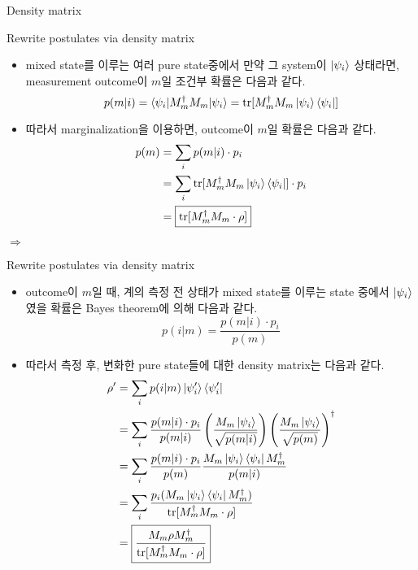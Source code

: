 \documentclass[9pt]{beamer}
\begin{document}
\begin{section}{Density matrix}
        \begin{frame}{Rewrite postulates via density matrix}
            \begin{itemize}
                \item mixed state를 이루는 여러 pure state중에서 만약 그 system이 $\ket{\psi_i}$ 상태라면, measurement outcome이 $m$일 \alert{조건부} 확률은 다음과 같다.
                $$p(m|i) = \braket{\psi_i | M_m^\dagger M_m | \psi_i} = \text{tr}[M_m^\dagger M_m \ket{\psi_i} \bra{\psi_i}]$$
                \item 따라서 marginalization을 이용하면, outcome이 $m$일 확률은 다음과 같다.
                \begin{align*} p(m) &= \sum_i p(m|i) \cdot  p_i\\ &=\sum_i\text{tr}[M_m^\dagger M_m \ket{\psi_i} \bra{\psi_i}] \cdot p_i \\ &= \boxed{\text{tr}[M_m^\dagger M_m \cdot  \rho]}\end{align*} 
            \end{itemize}
            $\Rightarrow$
            \vspace{1.8cm}
        \end{frame}

        \begin{frame}{Rewrite postulates via density matrix}
            \begin{itemize}
                \item outcome이 $m$일 때, 계의 측정 전 상태가 mixed state를 이루는 state 중에서 $\ket{\psi_i}$였을 확률은 Bayes theorem에 의해 다음과 같다. 
                $$p(i|m) = \frac{p(m|i) \cdot p_i}{p(m)} $$
                \item 따라서 측정 후, 변화한 pure state들에 대한 density matrix는 다음과 같다. 
                \begin{align*}
                    \rho' &=  \sum_i p(i|m) \ket{\psi_i'} \bra{\psi_i'} \\ &= \sum_i \frac{p(m|i) \cdot p_i}{p(m|i)} \left(\frac{M_m\ket{\psi_i}}{ \sqrt{p(m|i)}} \right) \left( \frac{M_m\ket{\psi_i}}{ \sqrt{p(m)}}\right)^\dagger
                    \\ &= \sum_i \frac{p(m|i) \cdot p_i}{p(m)} \frac{M_m\ket{\psi_i} \bra{\psi_i} M_m^\dagger}{{p(m|i)}} 
                    \\ &= \sum_i \frac{ p_i (M_m\ket{\psi_i} \bra{\psi_i} M_m^\dagger)}{\text{tr}[M_m^\dagger M_m \cdot  \rho]} 
                    \\ &= \boxed{\frac{M_m\rho M_m^\dagger}{ {\text{tr}[M^\dagger_m M_m \cdot \rho] }}}
                \end{align*}
            \end{itemize}
        \end{frame}


\end{section}
\end{document}
